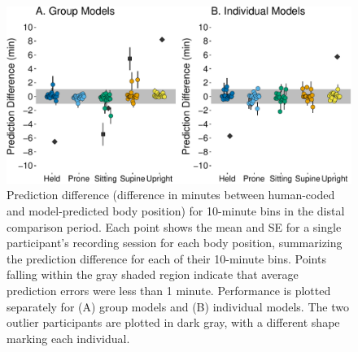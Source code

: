 \documentclass[
  man]{apa6}
\begin{document}
\begin{figure}

{\centering \includegraphics{manuscript_files/figure-latex/part2bins-1} 

}

\caption{Prediction difference (difference in minutes between human-coded and model-predicted body position) for 10-minute bins in the distal comparison period. Each point shows the mean and SE for a single participant's recording session for each body position, summarizing the prediction difference for each of their 10-minute bins. Points falling within the gray shaded region indicate that average prediction errors were less than 1 minute. Performance is plotted separately for (A) group models and (B) individual models. The two outlier participants are plotted in dark gray, with a different shape marking each individual.}\label{fig:part2bins}
\end{figure}
\end{document}
